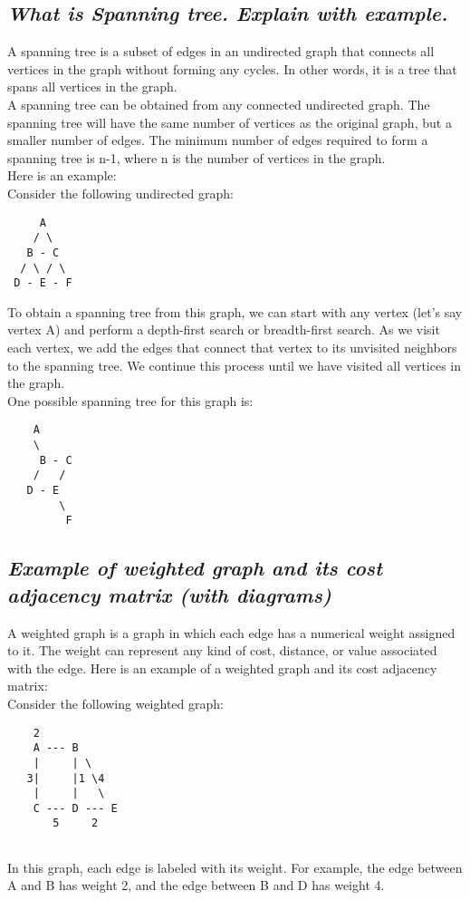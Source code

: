 \documentclass{article}
\begin{document}
\subsection{\textit{What is Spanning tree. Explain with example.}}
A spanning tree is a subset of edges in an undirected graph that connects all vertices in the graph without forming any cycles. In other words, it is a tree that spans all vertices in the graph.\\

A spanning tree can be obtained from any connected undirected graph. The spanning tree will have the same number of vertices as the original graph, but a smaller number of edges. The minimum number of edges required to form a spanning tree is n-1, where n is the number of vertices in the graph.\\

Here is an example:\\

Consider the following undirected graph:
\begin{lstlisting}
	 A
	/ \
   B - C
  / \ / \
 D - E - F

\end{lstlisting}
To obtain a spanning tree from this graph, we can start with any vertex (let's say vertex A) and perform a depth-first search or breadth-first search. As we visit each vertex, we add the edges that connect that vertex to its unvisited neighbors to the spanning tree. We continue this process until we have visited all vertices in the graph.\\

One possible spanning tree for this graph is:
\begin{lstlisting}
	A
	\
	 B - C
	/   / 
   D - E 
		\
		 F

\end{lstlisting}
\subsection{\textit{Example of weighted graph and its cost adjacency matrix (with diagrams)}}
A weighted graph is a graph in which each edge has a numerical weight assigned to it. The weight can represent any kind of cost, distance, or value associated with the edge. Here is an example of a weighted graph and its cost adjacency matrix:\\

Consider the following weighted graph:
\begin{lstlisting}
	2
	A --- B
	|     | \
   3|     |1 \4
	|     |   \
	C --- D --- E
	   5     2
 
\end{lstlisting}
In this graph, each edge is labeled with its weight. For example, the edge between A and B has weight 2, and the edge between B and D has weight 4.\\
\end{document}
